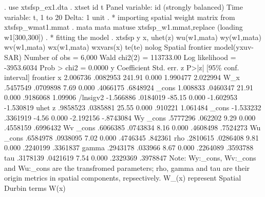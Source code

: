 . use xtsfsp_ex1.dta
{\smallskip}
. xtset id t 
{\smallskip}
Panel variable: id (strongly balanced)
 Time variable: t, 1 to 20
         Delta: 1 unit
{\smallskip}
. * importing spatial weight matrix from xtsfsp_wmat1.mmat
. mata mata matuse xtsfsp_w1.mmat,replace
(loading w1[300,300])
{\smallskip}
. * fitting the model
. xtsfsp y x, uhet(z) wu(w1,mata) wy(w1,mata) wv(w1,mata) wx(w1,mata) wxvars(x) te(te) nolog
{\smallskip}
Spatial frontier model(yxuv-SAR)                     Number of obs =     6,000
                                                     Wald chi2(2)  = 113733.00
Log likelihood = -3953.6034                          Prob > chi2   =    0.0000
{\smallskip}
           y {\VBAR} Coefficient  Std. err.      z    P>|z|     [95\% conf. interval]
frontier     {\VBAR}
           x {\VBAR}   2.006736   .0082953   241.91   0.000     1.990477    2.022994
         W_x {\VBAR}   .5457549   .0709898     7.69   0.000     .4066175    .6848924
       _cons {\VBAR}   1.008833   .0460347    21.91   0.000     .9186068     1.09906
    /lnsigv2 {\VBAR}  -1.566886   .0184019   -85.15   0.000    -1.602953   -1.530819
uhet         {\VBAR}
           z {\VBAR}   .9858523   .0385881    25.55   0.000      .910221    1.061484
       _cons {\VBAR}  -1.533232   .3361919    -4.56   0.000    -2.192156   -.8743084
Wy           {\VBAR}
       _cons {\VBAR}   .5777296    .062202     9.29   0.000     .4558159    .6996432
Wv           {\VBAR}
       _cons {\VBAR}   .6066385   .0743834     8.16   0.000     .4608498    .7524273
Wu           {\VBAR}
       _cons {\VBAR}   .6584978   .0938095     7.02   0.000     .4746345     .842361
         rho {\VBAR}   .2810615   .0286408     9.81   0.000     .2240199    .3361837
       gamma {\VBAR}   .2943178    .033966     8.67   0.000     .2264089    .3593788
         tau {\VBAR}   .3178139   .0421619     7.54   0.000     .2329369    .3978847
Note: Wy:_cons, Wv:_cons and Wu:_cons are the transfromed parameters;
      rho, gamma and tau are their origin metrics in spatial components, repsectively.
      W_(x) represent Spatial Durbin terms W(x)
